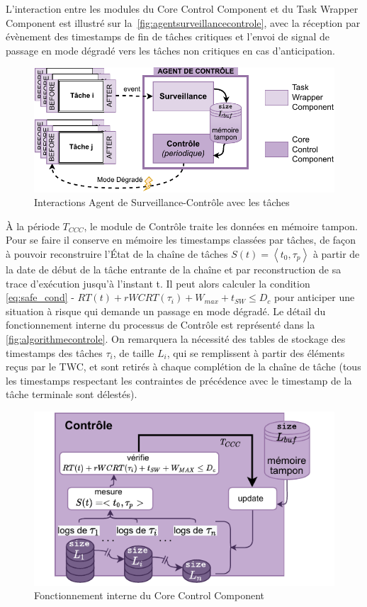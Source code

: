 \documentclass[french, a4paper, 11pt, twoside, pdftex]{StyleThese}
\begin{document}
	L’interaction entre les modules du Core Control Component et du Task Wrapper Component est illustré sur la~\autoref{fig:agentsurveillancecontrole}, avec la réception par évènement des timestamps de fin de tâches critiques et l'envoi de signal de passage en mode dégradé vers les tâches non critiques en cas d'anticipation.

	\begin{figure}[ht]
		\centering
		\includegraphics[width=0.8\linewidth]{schemas/AgentSurveillance_Controle}
		\caption{Interactions Agent de Surveillance-Contrôle avec les tâches}
		\label{fig:agentsurveillancecontrole}
	\end{figure}

	À la période $T_{CCC}$, le module de Contrôle traite les données en mémoire tampon. Pour se faire il conserve en mémoire les timestamps classées par tâches, de façon à pouvoir reconstruire l’État de la chaîne de tâches $S(t) = \left\langle t_0, \tau_p \right\rangle$ à partir de la date de début de la tâche entrante de la chaîne et par reconstruction de sa trace d'exécution jusqu'à l'instant t. Il peut alors calculer la condition \autoref{eq:safe_cond} - $ RT(t) + rWCRT(\tau_i) + W_{max} + t_{SW} \leq D_c $ pour anticiper une situation à risque qui demande un passage en mode dégradé. Le détail du fonctionnement interne du processus de Contrôle est représenté dans la \autoref{fig:algorithmecontrole}. On remarquera la nécessité des tables de stockage des timestamps des tâches $\tau_i$, de taille $L_i$, qui se remplissent à partir des éléments reçus par le TWC, et sont retirés à chaque complétion de la chaîne de tâche (tous les timestamps respectant les contraintes de précédence avec le timestamp de la tâche terminale sont délestés). 
	
	\begin{figure}[th]
		\centering
		\includegraphics[width=0.7\linewidth]{schemas/Algorithme_Controle}
		\caption{Fonctionnement interne du Core Control Component}
		\label{fig:algorithmecontrole}
	\end{figure}
	
\end{document}
